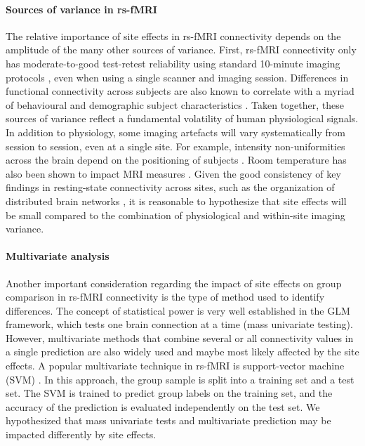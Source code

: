 \documentclass[authoryear]{elsarticle}
\begin{document}
\paragraph{Sources of variance in rs-fMRI}
The relative importance of site effects in rs-fMRI connectivity depends on the amplitude of the many other sources of variance. First, rs-fMRI connectivity only has moderate-to-good test-retest reliability using standard 10-minute imaging protocols \citep{Shehzad2009}, even when using a single scanner and imaging session. Differences in functional connectivity across subjects are also known to correlate with a myriad of behavioural and demographic subject characteristics \cite{Anand2007,Sheline2010,Kilpatrick2006}. Taken together, these sources of variance reflect a fundamental volatility of human physiological signals. In addition to physiology, some imaging artefacts will vary systematically from session to session, even at a single site. For example, intensity non-uniformities across the brain depend on the positioning of subjects \citep{Caramanos2010}. Room temperature has also been shown to impact MRI measures \citep{Vanhoutte2006}. Given the good consistency of key findings in resting-state connectivity across sites, such as the organization of distributed brain networks \citep{Biswal2010}, it is reasonable to hypothesize that site effects will be small compared to the combination of physiological and within-site imaging variance.

\paragraph{Multivariate analysis}
Another important consideration regarding the impact of site effects on group comparison in rs-fMRI connectivity is the type of method used to identify differences. The concept of statistical power is very well established in the GLM framework, which tests one brain connection at a time (mass univariate testing). However, multivariate methods that combine several or all connectivity values in a single prediction are also widely used and maybe most likely affected by the site effects. A popular multivariate technique in rs-fMRI is support-vector machine (SVM) \citep{Cortes1995}. In this approach, the group sample is split into a training set and a test set. The SVM is trained to predict group labels on the training set, and the accuracy of the prediction is evaluated independently on the test set. We hypothesized that mass univariate tests and multivariate prediction may be impacted differently by site effects. 
\end{document}
